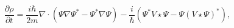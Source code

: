 \begin{equation}
\frac{\partial\rho}{\partial t}=\frac{i\hbar}{2m}\nabla\cdot\left(  \Psi
\nabla\Psi^{\ast}-\Psi^{\ast}\nabla\Psi\right)  -\frac{i}{\hbar}\left(
\Psi^{\ast}V\star\Psi-\Psi\left(  V\star\Psi\right)  ^{\ast}\right)
,\label{30}%
\end{equation}

